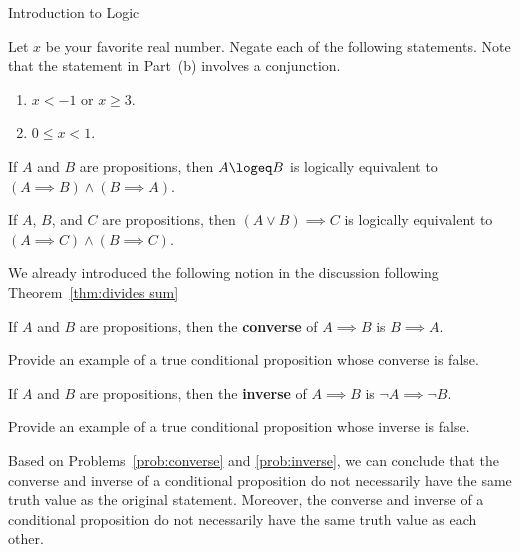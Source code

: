 \begin{section}{Introduction to Logic}
\begin{problem}\label{prob:negation}
Let $x$ be your favorite real number.  Negate each of the following statements.  Note that the statement in Part~(b) involves a conjunction.
\begin{enumerate}[label=\textrm{(\alph*)}]
\item $x<-1$ or $x\geq 3$.
\item $0\leq x< 1$.
\end{enumerate}
\end{problem}

\begin{theorem}\label{thm:logical form for iff}
If $A$ and $B$ are propositions, then $A\logeq B$ is logically equivalent to $(A\implies B)\wedge (B\implies A)$.
\end{theorem}

\begin{theorem}\label{thm:logical form for cases}
If $A$, $B$, and $C$ are propositions, then $(A\vee B)\implies C$ is logically equivalent to $(A\implies C)\wedge (B\implies C)$.
\end{theorem}

We already introduced the following notion in the discussion following Theorem~\ref{thm:divides sum}

\begin{definition}\label{def:converse}
If $A$ and $B$ are propositions, then the \textbf{converse} of $A \implies B$ is $B \implies A$.
\end{definition}

\begin{problem}\label{prob:converse}
Provide an example of a true conditional proposition whose converse is false.
\end{problem}

\begin{definition}\label{def:inverse}
If $A$ and $B$ are propositions, then the \textbf{inverse} of $A \implies B$ is $\neg A \implies \neg B$.
\end{definition}

\begin{problem}\label{prob:inverse}
Provide an example of a true conditional proposition whose inverse is false.
\end{problem}

Based on Problems~\ref{prob:converse} and \ref{prob:inverse}, we can conclude that the converse and inverse of a conditional proposition do not necessarily have the same truth value as the original statement.  Moreover, the converse and inverse of a conditional proposition do not necessarily have the same truth value as each other.


\end{section}
